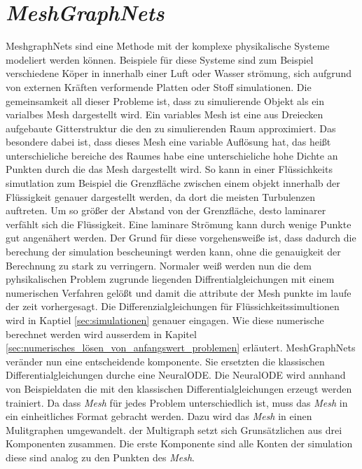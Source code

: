 

\section{\textit{MeshGraphNets}} \label{sec:meshgraphnets}

MeshgraphNets \cite{meshgraphnets} sind eine Methode mit der komplexe physikalische Systeme modeliert werden können.
Beispiele für diese Systeme sind zum Beispiel verschiedene Köper in innerhalb einer Luft oder Wasser strömung, 
sich aufgrund von externen Kräften verformende Platten oder Stoff simulationen.
Die gemeinsamkeit all dieser Probleme ist, dass zu simulierende Objekt als ein varialbes Mesh dargestellt wird.
Ein variables Mesh ist eine aus Dreiecken aufgebaute Gitterstruktur die den zu simulierenden Raum approximiert.
Das besondere dabei ist, dass dieses Mesh eine variable Auflösung hat, das heißt unterschieliche bereiche des Raumes 
habe eine unterschieliche hohe Dichte an Punkten durch die das Mesh dargestellt wird.
So kann in einer Flüssichkeits simutlation zum Beispiel die Grenzfläche zwischen einem objekt innerhalb der Flüssigkeit
genauer dargestellt werden, da dort die meisten Turbulenzen auftreten.
Um so größer der Abstand von der Grenzfläche, desto laminarer verfählt sich die Flüssigkeit.
Eine laminare Strömung kann durch wenige Punkte gut angenähert werden.
Der Grund für diese vorgehensweiße ist, dass dadurch die berechung der simulation bescheuningt werden kann,
ohne die genauigkeit der Berechnung zu stark zu verringern.
Normaler weiß werden nun die dem pyhsikalischen Problem zugrunde liegenden Diffrentialgleichungen mit einem numerischen Verfahren gelößt und damit die attribute der Mesh punkte im laufe der zeit vorhergesagt.
Die Differenzialgleichungen für Flüssichkeitssimultionen wird in Kaptiel \ref{sec:simulationen} genauer eingagen.
Wie diese numerische berechnet werden wird ausserdem in Kapitel \ref{sec:numerisches_lösen_von_anfangswert_problemen} erläutert.
MeshGraphNets veränder nun eine entscheidende komponente.
Sie ersetzten die klassischen Differentialgleichungen durche eine NeuralODE.
Die NeuralODE wird annhand von Beispieldaten die mit den klassischen Differentialgleichungen erzeugt werden trainiert.
Da dass \textit{Mesh} für jedes Problem unterschiedlich ist, muss das \textit{Mesh} in ein einheitliches Format gebracht werden.
Dazu wird das \textit{Mesh} in einen Mulitgraphen umgewandelt.
der Multigraph setzt sich Grunsätzlichen aus drei Komponenten zusammen.
Die erste Komponente sind alle Konten der simulation diese sind analog zu den Punkten des \textit{Mesh}.

